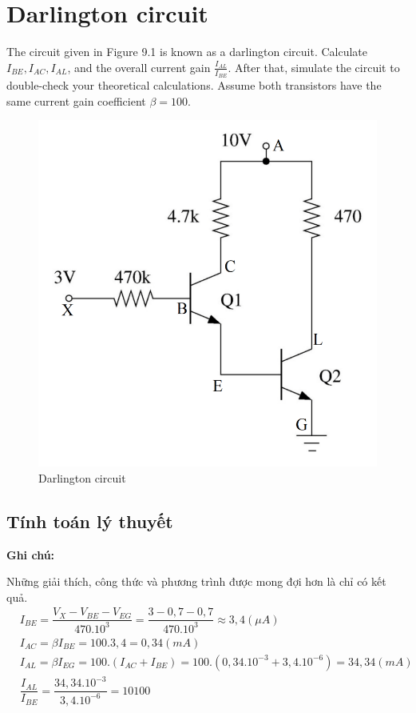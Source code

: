 \section{Darlington circuit}
The circuit given in Figure 9.1 is known as a darlington circuit. Calculate \(I_{BE} , I_{AC} , I_{AL}\),
and the overall current gain \(\frac{I_{AL}}{I_{BE}}\). After that, simulate the circuit to double-check your
theoretical calculations. Assume both transistors have the same current gain coefficient
\(\beta = 100.\)
\begin{figure}[ht]
    \centering
    \includegraphics[scale=0.4]{graphics/ex9/f1.png}
    \caption{Darlington circuit}
\end{figure}
\subsection{Tính toán lý thuyết}
\textbf{Ghi chú:}

Những giải thích, công thức và phương trình được mong đợi hơn là chỉ có kết quả.
    \begin{align*}
    &I_{BE}=\dfrac{V_X - V_{BE} - V_{EG}}{470.10^3} = \dfrac{3 - 0,7 - 0,7}{470.10^3} \approx 3,4 (\mu A) \\
    &I_{AC} = \beta I_{BE} = 100.3,4 = 0,34 (mA)\\
    &I_{AL} = \beta I_{EG} = 100.(I_{AC} + I_{BE}) = 100.(0,34.10^{-3} + 3,4.10^{-6}) = 34,34 (mA)\\
    &\dfrac{I_{AL}}{I_{BE}} = \dfrac{34,34.10^{-3}}{3,4.10^{-6}} = 10100\\
    \end{align*}
    \newpage
